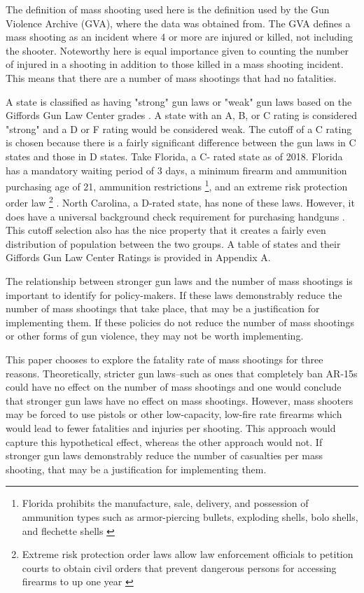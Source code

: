 \documentclass{article}
\begin{document}
The definition of mass shooting used here is the definition used by the Gun Violence Archive (GVA), where the data was obtained from. The GVA defines a mass shooting as an incident where 4 or more are injured or killed, not including the shooter. Noteworthy here is equal importance given to counting the number of injured in a shooting in addition to those killed in a mass shooting incident. This means that there are a number of mass shootings that had no fatalities.

A state is classified as having "strong" gun laws or "weak" gun laws based on the Giffords Gun Law Center grades \cite{4}. A state with an A, B, or C rating is considered "strong" and a D or F rating would be considered weak. The cutoff of a C rating is chosen because there is a fairly significant difference between the gun laws in C states and those in D states. Take Florida, a C- rated state as of 2018. Florida has a mandatory waiting period of 3 days, a minimum firearm and ammunition purchasing age of 21, ammunition restrictions \footnote{Florida prohibits the manufacture, sale, delivery, and possession of ammunition types such as armor-piercing bullets, exploding shells, bolo shells, and flechette shells \cite{7}}, and an extreme risk protection order law \footnote{Extreme risk protection order laws allow law enforcement officials to petition courts to obtain civil orders that prevent dangerous persons for accessing firearms to up one year \cite{8}} \cite{5}. North Carolina, a D-rated state, has none of these laws. However, it does have a universal background check requirement for purchasing handguns \cite{6}. This cutoff selection also has the nice property that it creates a fairly even distribution of population between the two groups. A table of states and their Giffords Gun Law Center Ratings is provided in Appendix A. 

The relationship between stronger gun laws and the number of mass shootings is important to identify for policy-makers. If these laws demonstrably reduce the number of mass shootings that take place, that may be a justification for implementing them. If these policies do not reduce the number of mass shootings or other forms of gun violence, they may not be worth implementing. 

This paper chooses to explore the fatality rate of mass shootings for three reasons. Theoretically, stricter gun laws–such as ones that completely ban AR-15s could have no effect on the number of mass shootings and one would conclude that stronger gun laws have no effect on mass shootings. However, mass shooters may be forced to use pistols or other low-capacity, low-fire rate firearms which would lead to fewer fatalities and injuries per shooting. This approach would capture this hypothetical effect, whereas the other approach would not. If stronger gun laws demonstrably reduce the number of casualties per mass shooting, that may be a justification for implementing them.
\end{document}
